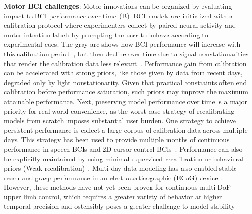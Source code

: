 \documentclass[12pt,oneside]{report}
\begin{document}
\textbf{Motor BCI challenges}: Motor innovations can be organized by evaluating impact to BCI performance over time~(B). BCI models are initialized with a calibration protocol where experimenters collect by paired neural activity and motor intention labels by prompting the user to behave according to experimental cues. The gray arc shows how BCI performance will increase with this calibration period~\citep{makin_18_refh}, but then decline over time due to signal nonstationarities that render the calibration data less relevant~\citep{karpowicz2022stabilizing}. Performance gain from calibration can be accelerated with strong priors, like those given by data from recent days, degraded only by light nonstationarity. Given that practical constraints often end calibration before performance saturation, such priors may improve the maximum attainable performance. Next, preserving model performance over time is a major priority for real world convenience, as the worst case strategy of recalibrating models from scratch imposes substantial user burden. One strategy to achieve persistent performance is collect a large corpus of calibration data across multiple days. This strategy has been used to provide multiple months of continuous performance in speech BCIs and 2D cursor control BCIs~\citep{willett_23_speech,card2024accurate,sussillo_16_future,hosman2023months}. Performance can also be explicitly maintained by using minimal supervised recalibration or behavioral priors (Weak recalibration)~\citep{wilson_23_prit,fan2023plugandplay}.
Multi-day data modeling has also enabled stable reach and grasp performance in an electrocorticographic (ECoG) device~\citep{Natraj2025robot}. However, these methods have not yet been proven for continuous multi-DoF upper limb control, which requires a greater variety of behavior at higher temporal precision and ostensibly poses a greater challenge to model stability.
\end{document}
